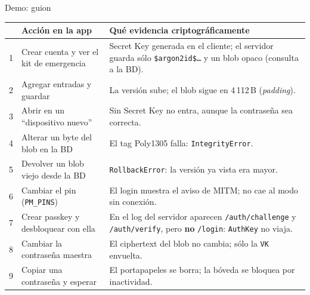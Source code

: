 \documentclass[aspectratio=169,10pt]{beamer}
\newcommand{\key}[1]{\textcolor{cripto}{\texttt{#1}}}
\begin{document}
\begin{frame}{Demo: guion}
  \centering\scriptsize
  \renewcommand{\arraystretch}{1.05}
  \begin{tabular}{@{}c p{} p{}@{}}
    \toprule
    & \textbf{Acción en la app} & \textbf{Qué evidencia criptográficamente} \\
    \midrule
    1 & Crear cuenta y ver el kit de emergencia & Secret Key generada en el cliente; el servidor guarda sólo
        \texttt{\$argon2id\$\ldots} y un blob opaco (consulta a la BD). \\
    2 & Agregar entradas y guardar & La versión sube; el blob sigue en 4\,112\,B (\emph{padding}). \\
    3 & Abrir en un ``dispositivo nuevo'' & Sin Secret Key no entra, aunque la contraseña sea correcta. \\
    4 & Alterar un byte del blob en la BD & El tag Poly1305 falla: \texttt{IntegrityError}. \\
    5 & Devolver un blob viejo desde la BD & \texttt{RollbackError}: la versión ya vista era mayor. \\
    6 & Cambiar el pin (\texttt{PM\_PINS}) & El login muestra el aviso de MITM; no cae al modo sin conexión. \\
    7 & Crear passkey y desbloquear con ella & En el log del servidor aparecen \texttt{/auth/challenge} y
        \texttt{/auth/verify}, pero \textbf{no} \texttt{/login}: \key{AuthKey} no viaja. \\
    8 & Cambiar la contraseña maestra & El ciphertext del blob no cambia; sólo la \key{VK} envuelta. \\
    9 & Copiar una contraseña y esperar & El portapapeles se borra; la bóveda se bloquea por inactividad. \\
    \bottomrule
  \end{tabular}
\end{frame}
\end{document}
